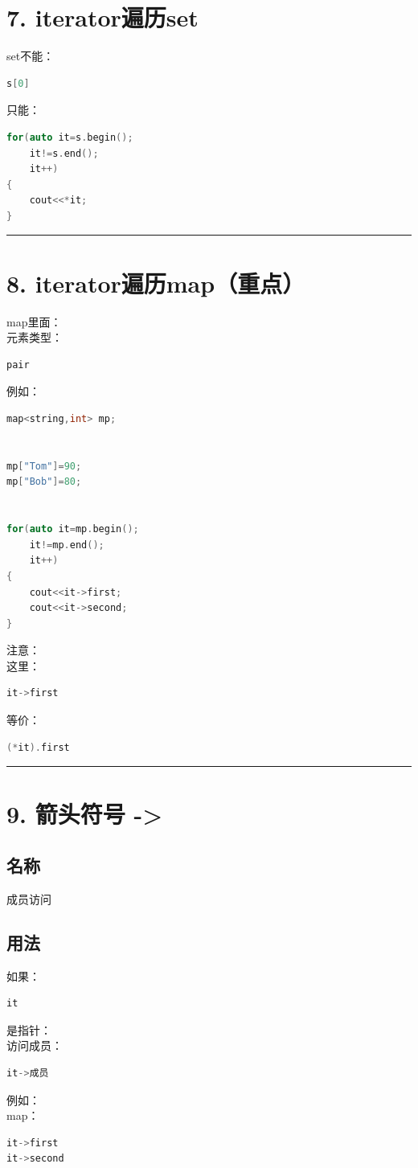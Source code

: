\documentclass[10pt,twocolumn]{extarticle}
\begin{document}
\section{7. iterator遍历set}

set不能：
\begin{lstlisting}[language=C++]
s[0]
\end{lstlisting}
只能：
\begin{lstlisting}[language=C++]
for(auto it=s.begin();
    it!=s.end();
    it++)
{
    cout<<*it;
}
\end{lstlisting}

\noindent\rule{\linewidth}{0.4pt}

\section{8. iterator遍历map（重点）}

map里面：\\
元素类型：
\begin{lstlisting}[language=C++]
pair
\end{lstlisting}
例如：
\begin{lstlisting}[language=C++]
map<string,int> mp;


mp["Tom"]=90;
mp["Bob"]=80;


for(auto it=mp.begin();
    it!=mp.end();
    it++)
{
    cout<<it->first;
    cout<<it->second;
}
\end{lstlisting}
注意：\\
这里：
\begin{lstlisting}[language=C++]
it->first
\end{lstlisting}
等价：
\begin{lstlisting}[language=C++]
(*it).first
\end{lstlisting}

\noindent\rule{\linewidth}{0.4pt}

\section{9. 箭头符号 ->}

\subsection{名称}
成员访问

\subsection{用法}
如果：
\begin{lstlisting}[language=C++]
it
\end{lstlisting}
是指针：\\
访问成员：
\begin{lstlisting}[language=C++]
it->成员
\end{lstlisting}
例如：\\
map：
\begin{lstlisting}[language=C++]
it->first
it->second
\end{lstlisting}
\end{document}
